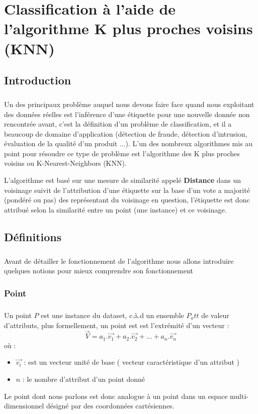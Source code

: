 \chapter{Classification à l'aide de l'algorithme K plus proches voisins (KNN)}\label{knn}
	\section{Introduction}
		\paragraph{}
		Un des principaux problème auquel nous devons faire face quand nous exploitant des données réelles est l'inférence d'une étiquette pour une nouvelle donnée non rencontrée avant, c'est la définition d'un problème de classification, et il a beaucoup de domaine d'application (détection de fraude, détection d'intrusion, évaluation de la qualité d'un produit ...). L'un des nombreux algorithmes mis au point pour résoudre ce type de problème est l'algorithme des K plus proches voisins ou K-Nearest-Neighbors (KNN).
		\par 
		 L'algorithme est basé sur une mesure de similarité appelé \textbf{Distance} dans un voisinage suivit de l'attribution d'une étiquette sur la base d'un vote a majorité (pondéré ou pas) des représentant du voisinage en question, l'étiquette est donc attribué selon la similarité entre un point (une instance) et ce voisinage.
	\newpage
	\section{Définitions}
		\paragraph{}
		Avant de détailler le fonctionnement de l'algorithme nous allons introduire quelques notions pour mieux comprendre son fonctionnement
		\subsection{Point}\label{point}
			\paragraph{}
			Un point $P$ est une instance du dataset, c.à.d un ensemble $P_att$ de valeur d'attributs, plus formellement, un point est est l'extrémité d'un vecteur : \[\vec{V} = a_1.\vec{v_1} + a_2.\vec{v_2} + ... + a_n.\vec{v_n} \]
			où : 
			\begin{itemize}
				\item $\vec{v_i} $ : est un vecteur unité de base ( vecteur caractéristique d'un attribut )
				\item $n$ : le nombre d'attribut d'un point donné
			\end{itemize}
		Le point dont nous parlons est donc analogue à un point dans un espace multi-dimensionnel désigné par des coordonnées cartésiennes.
